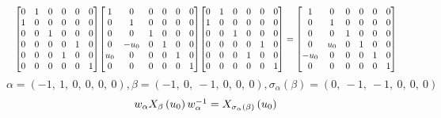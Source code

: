 \documentclass[11pt]{article}
\theoremstyle{definition}
\begin{document}
\[
\scaletoalign{\textwidth}{{\left[\begin{matrix}0 & 1 & 0 & 0 & 0 & 0\\1 & 0 & 0 & 0 & 0 & 0\\0 & 0 & 1 & 0 & 0 & 0\\0 & 0 & 0 & 0 & 1 & 0\\0 & 0 & 0 & 1 & 0 & 0\\0 & 0 & 0 & 0 & 0 & 1\end{matrix}\right]} {\left[\begin{matrix}1 & 0 & 0 & 0 & 0 & 0\\0 & 1 & 0 & 0 & 0 & 0\\0 & 0 & 1 & 0 & 0 & 0\\0 & - u_{0} & 0 & 1 & 0 & 0\\u_{0} & 0 & 0 & 0 & 1 & 0\\0 & 0 & 0 & 0 & 0 & 1\end{matrix}\right]} {\left[\begin{matrix}0 & 1 & 0 & 0 & 0 & 0\\1 & 0 & 0 & 0 & 0 & 0\\0 & 0 & 1 & 0 & 0 & 0\\0 & 0 & 0 & 0 & 1 & 0\\0 & 0 & 0 & 1 & 0 & 0\\0 & 0 & 0 & 0 & 0 & 1\end{matrix}\right]} = {\left[\begin{matrix}1 & 0 & 0 & 0 & 0 & 0\\0 & 1 & 0 & 0 & 0 & 0\\0 & 0 & 1 & 0 & 0 & 0\\0 & u_{0} & 0 & 1 & 0 & 0\\- u_{0} & 0 & 0 & 0 & 1 & 0\\0 & 0 & 0 & 0 & 0 & 1\end{matrix}\right]}}
\]
\[
\alpha = \left( -1, \  1, \  0, \  0, \  0, \  0\right), \beta = \left( -1, \  0, \  -1, \  0, \  0, \  0\right), \sigma_{\alpha}(\beta) = \left( 0, \  -1, \  -1, \  0, \  0, \  0\right)
\]
\[
\scaletoalign{\textwidth}{w_{\alpha} X_{\beta}\left(u_{0}\right) w_{\alpha}^{-1} = X_{\sigma_{\alpha}\left(\beta\right)}\left(u_{0}\right)}
\]
\end{document}
